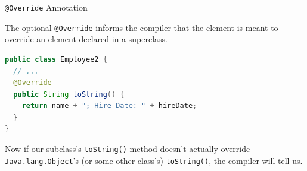 \documentclass{beamer}
\begin{document}
\begin{frame}[fragile]{{\tt @Override} Annotation}

The optional {\tt @Override}  informs the compiler that the element is meant to override an element declared in a superclass.

\begin{lstlisting}[language=Java]
public class Employee2 {
  // ...
  @Override
  public String toString() {
    return name + "; Hire Date: " + hireDate;
  }
}
\end{lstlisting}
Now if our subclass's {\tt toString()} method doesn't actually override {\tt Java.lang.Object}'s (or some other class's) {\tt toString()}, the compiler will tell us.
\end{frame}





\end{document}
